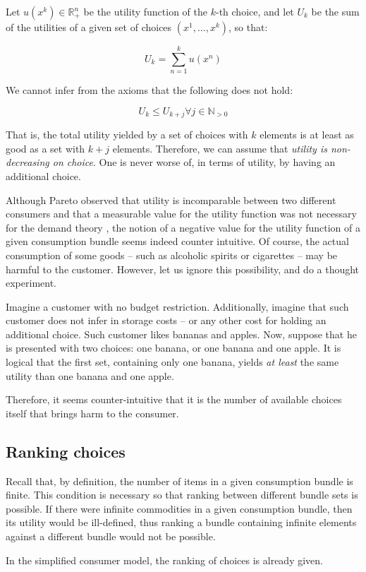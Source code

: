 \documentclass[12pt, letterpaper]{article}
\begin{document}
	Let $u(x^k) \in \mathbb{R}_+^n$ be the utility function of the $k$-th choice, and let $U_k$ be the sum of the utilities of a given set of choices $(x^1, \dots , x^k)$, so that:

	\[ U_k = \sum_{n=1}^{k} u(x^n) \]

	We cannot infer from the axioms that the following does not hold:

	\begin{equation}
		U_k \leq U_{k+j} \forall j \in \mathbb{N}_{> 0}
	\end{equation}

	That is, the total utility yielded by a set of choices with $k$ elements is at least as good as a set with $k+j$ elements. Therefore, we can assume that \textit{utility is non-decreasing on choice}. One is never worse of, in terms of utility, by having an additional choice.

	Although Pareto observed that utility is incomparable between two different consumers and that a measurable value for the utility function was not necessary for the demand theory \cite{pareto1897}, the notion of a negative value for the utility function of a given consumption bundle seems indeed counter intuitive. Of course, the actual consumption of some goods -- such as alcoholic spirits or cigarettes -- may be harmful to the customer. However, let us ignore this possibility, and do a thought experiment.

	Imagine a customer with no budget restriction. Additionally, imagine that such customer does not infer in storage costs -- or any other cost for holding an additional choice. Such customer likes bananas and apples. Now, suppose that he is presented with two choices: one banana, or one banana and one apple. It is logical that the first set, containing only one banana, yields \textit{at least} the same utility than one banana and one apple.

	Therefore, it seems counter-intuitive that it is the number of available choices itself that brings harm to the consumer.

	\subsection{Ranking choices}
	Recall that, by definition, the number of items in a given consumption bundle is finite. This condition is necessary so that ranking between different bundle sets is possible. If there were infinite commodities in a given consumption bundle, then its utility would be ill-defined, thus ranking a bundle containing infinite elements against a different bundle would not be possible.

	In the simplified consumer model, the ranking of choices is already given.




\end{document}
